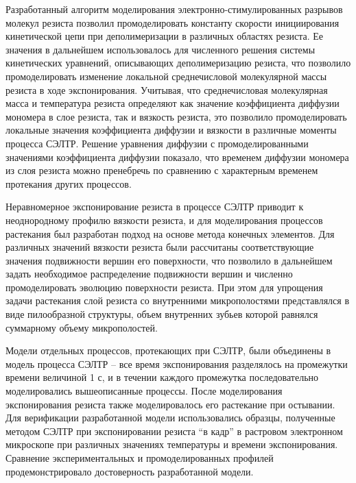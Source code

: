 Разработанный алгоритм моделирования электронно-стимулированных разрывов молекул резиста позволил промоделировать константу скорости инициирования кинетической цепи при деполимеризации в различных областях резиста.
Ее значения в дальнейшем использовалось для численного решения системы кинетических уравнений, описывающих деполимеризацию резиста, что позволило промоделировать изменение локальной среднечисловой молекулярной массы резиста в ходе экспонирования.
Учитывая, что среднечисловая молекулярная масса и температура резиста определяют как значение коэффициента диффузии мономера в слое резиста, так и вязкость резиста, это позволило промоделировать локальные значения коэффициента диффузии и вязкости в различные моменты процесса СЭЛТР.
Решение уравнения диффузии с промоделированными значениями коэффициента диффузии показало, что временем диффузии мономера из слоя резиста можно пренебречь по сравнению с характерным временем протекания других процессов.

Неравномерное экспонирование резиста в процессе СЭЛТР приводит к неоднородному профилю вязкости резиста, и для моделирования процессов растекания был разработан подход на основе метода конечных элементов.
Для различных значений вязкости резиста были рассчитаны соответствующие значения подвижности вершин его поверхности, что позволило в дальнейшем задать необходимое распределение подвижности вершин и численно промоделировать эволюцию поверхности резиста.
При этом для упрощения задачи растекания слой резиста со внутренними микрополостями представлялся в виде пилообразной структуры, объем внутренних зубьев которой равнялся суммарному объему микрополостей.

Модели отдельных процессов, протекающих при СЭЛТР, были объединены в модель процесса СЭЛТР -- все время экспонирования разделялось на промежутки времени величиной 1 с, и в течении каждого промежутка последовательно моделировались вышеописанные процессы.
После моделирования экспонирования резиста также моделировалось его растекание при остывании.
Для верификации разработанной модели использовались образцы, полученные методом СЭЛТР при экспонировании резиста ``в кадр'' в растровом электронном микроскопе при различных значениях температуры и времени экспонирования.
Сравнение экспериментальных и промоделированных профилей продемонстрировало достоверность разработанной модели.

